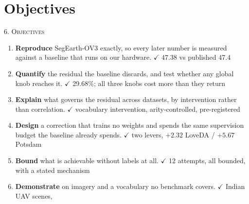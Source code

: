\documentclass[aspectratio=169]{beamer}
\newcommand{\ok}[1]{\textcolor{good}{#1}}
\begin{document}
\section{Objectives}
\begin{frame}{\textsc{6. Objectives}}
\begin{enumerate}
  \item \textbf{Reproduce} SegEarth-OV3 exactly, so every later number is
        measured against a baseline that runs on our hardware.
        \ok{$\checkmark$ 47.38 vs published 47.4}
  \item \textbf{Quantify} the residual the baseline discards, and test whether
        any global knob reaches it. \ok{$\checkmark$ 29.68\%; all three knobs cost more than they return}
  \item \textbf{Explain} what governs the residual across datasets, by
        intervention rather than correlation. \ok{$\checkmark$ vocabulary intervention, arity-controlled, pre-registered}
  \item \textbf{Design} a correction that trains no weights and spends the same
        supervision budget the baseline already spends.
        \ok{$\checkmark$ two levers, $+2.32$ LoveDA / $+5.67$ Potsdam}
  \item \textbf{Bound} what is achievable without labels at all.
        \ok{$\checkmark$ 12 attempts, all bounded, with a stated mechanism}
  \item \textbf{Demonstrate} on imagery and a vocabulary no benchmark covers.
        \ok{$\checkmark$ Indian UAV scenes, \indGSD{}}
\end{enumerate}
\end{frame}

\end{document}
